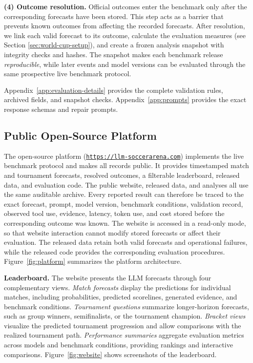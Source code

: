 \documentclass[sigconf,nonacm]{acmart}
\newcommand{\arenalink}{\href{https://llm-soccerarena.com}{\texttt{\small\color{blue}https://llm-soccerarena.com}}}
\begin{document}
\textbf{(4) Outcome resolution.}
Official outcomes enter the benchmark only after the corresponding forecasts have been stored. This step acts as a barrier that prevents known outcomes from affecting the recorded forecasts. After resolution, we link each valid forecast to its outcome, calculate the evaluation measures (see Section \ref{sec:world-cup-setup}), and create a frozen analysis snapshot with integrity checks and hashes. The snapshot makes each benchmark release \emph{reproducible}, while later events and model versions can be evaluated through the same prospective live benchmark protocol.

Appendix~\ref{app:evaluation-details} provides the complete validation rules, archived fields, and snapshot checks. Appendix~\ref{app:prompts} provides the exact response schemas and repair prompts.
\vspace{-0.35em}
\subsection{Public Open-Source Platform}
\label{sec:public-platform}

The open-source platform (\arenalink) implements the live benchmark protocol and makes all records public. It provides {timestamped match and tournament forecasts, resolved outcomes, a filterable leaderboard, released data, and evaluation code}. The public website, released data, and analyses all use the same {auditable archive}. Every reported result can therefore be traced to the exact forecast, prompt, model version, benchmark conditions, validation record, observed tool use, evidence, latency, token use, and cost stored before the corresponding outcome was known. The website is accessed in a read-only mode, so that website interaction cannot modify stored forecasts or affect their evaluation. The released data retain both valid forecasts and operational failures, while the released code provides the corresponding evaluation procedures. Figure~\ref{fig:platform} summarizes the platform architecture.

\textbf{Leaderboard.} The website presents the LLM forecasts through four complementary views.
\emph{Match forecasts} display the predictions for individual matches, including probabilities, predicted scorelines, generated evidence, and benchmark conditions. \emph{Tournament questions} summarize longer-horizon forecasts, such as group winners, semifinalists, or the tournament champion. \emph{Bracket views} visualize the predicted tournament progression and allow comparisons with the realized tournament path. \emph{Performance summaries} aggregate evaluation metrics across models and benchmark conditions, providing rankings and interactive comparisons. Figure~\ref{fig:website} shows screenshots of the leaderboard.
\end{document}

